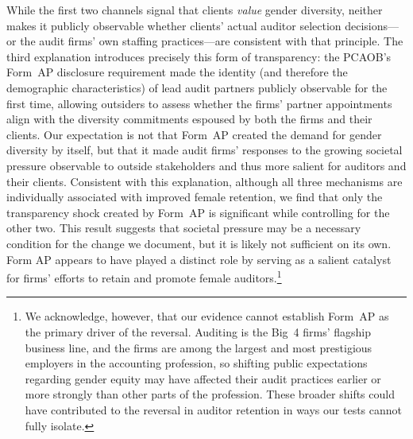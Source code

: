 \documentclass[11pt]{article}
\begin{document}
    While the first two channels signal that clients \textit{value} gender diversity, neither makes it publicly observable whether clients' actual auditor selection decisions---or the audit firms' own staffing practices---are consistent with that principle. The third explanation introduces precisely this form of transparency: the PCAOB's Form~AP disclosure requirement made the identity (and therefore the demographic characteristics) of lead audit partners publicly observable for the first time, allowing outsiders to assess whether the firms' partner appointments align with the diversity commitments espoused by both the firms and their clients. Our expectation is not that Form~AP created the demand for gender diversity by itself, but that it made audit firms' responses to the growing societal pressure observable to outside stakeholders and thus more salient for auditors and their clients. Consistent with this explanation, although all three mechanisms are individually associated with improved female retention, we find that only the transparency shock created by Form~AP is significant while controlling for the other two. This result suggests that societal pressure may be a necessary condition for the change we document, but it is likely not sufficient on its own. Form AP appears to have played a distinct role by serving as a salient catalyst for firms' efforts to retain and promote female auditors.\footnote{We acknowledge, however, that our evidence cannot establish Form~AP as the primary driver of the reversal. Auditing is the Big~4 firms' flagship business line, and the firms are among the largest and most prestigious employers in the accounting profession, so shifting public expectations regarding gender equity may have affected their audit practices earlier or more strongly than other parts of the profession. These broader shifts could have contributed to the reversal in auditor retention in ways our tests cannot fully isolate.} 
\end{document}
